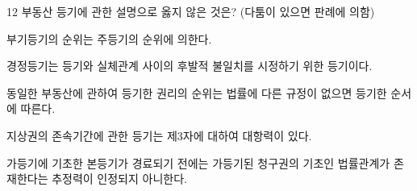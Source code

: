 \begin{question}{12}
부동산 등기에 관한 설명으로 옳지 않은 것은? (다툼이 있으면 판례에 의함)
\begin{choices}
  \item 부기등기의 순위는 주등기의 순위에 의한다.
  \item 경정등기는 등기와 실체관계 사이의 후발적 불일치를 시정하기 위한 등기이다.
  \item 동일한 부동산에 관하여 등기한 권리의 순위는 법률에 다른 규정이 없으면 등기한 순서에 따른다.
  \item 지상권의 존속기간에 관한 등기는 제3자에 대하여 대항력이 있다.
  \item 가등기에 기초한 본등기가 경료되기 전에는 가등기된 청구권의 기초인 법률관계가 존재한다는 추정력이 인정되지 아니한다.
\end{choices}
\end{question}
